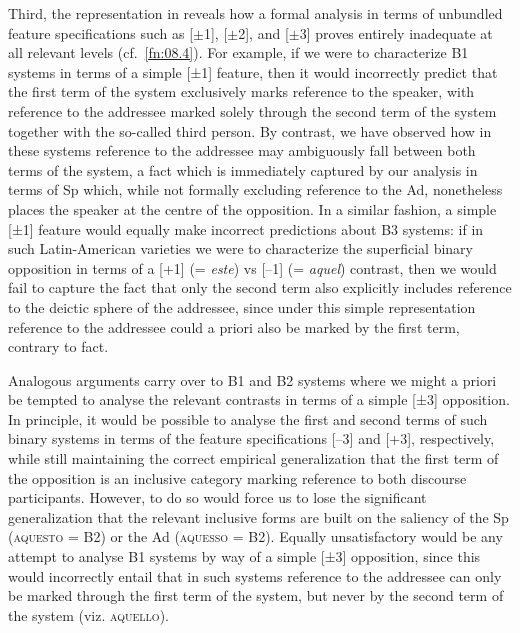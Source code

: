 \documentclass[output=paper]{langsci/langscibook}
\begin{document}
Third, the representation in  reveals how a formal analysis
in terms of unbundled feature specifications such as [${\pm}$1], [${\pm}$2],
and [${\pm}$3] proves entirely inadequate at all relevant levels (cf.\
\cref{fn:08.4}).  For example, if we were to characterize B1 systems
in terms of a simple [±1] feature, then it would incorrectly predict that the
first term of the system exclusively marks reference to the speaker, with
reference to the addressee marked solely through the second term of the system
together with the so-called third person. By contrast, we have observed how in
these systems reference to the addressee may ambiguously fall between both
terms of the system, a fact which is immediately captured by our analysis in
terms of Sp which, while not formally excluding reference to the Ad,
nonetheless places the speaker at the centre of the opposition. In a similar
fashion, a simple [±1] feature would equally make incorrect predictions about
B3 systems: if in such Latin-American \ili{Spanish} varieties we were to
characterize the superficial binary opposition in terms of a [+1] (=
\emph{este}) vs [–1] (= \emph{aquel}) contrast, then we would fail to capture
the fact that only the second term also explicitly includes reference to the
deictic sphere of the addressee, since under this simple representation
reference to the addressee could a priori also be marked by the first
term, contrary to fact.

Analogous arguments carry over to B1 and B2 systems where we might
a priori be tempted to analyse the relevant contrasts in terms of a
simple [±3] opposition. In principle, it would be possible to analyse the first
and second terms of such binary systems in terms of the feature specifications
[–3] and [+3], respectively, while still maintaining the correct empirical
generalization that the first term of the opposition is an inclusive category
marking reference to both discourse participants. However, to do so would force
us to lose the significant generalization \parencite[cf.][504f]{HarRit2002}
that the relevant inclusive forms are built on the saliency of the Sp
(\textsc{aquesto} = B2\tss{A}) or the Ad (\textsc{aquesso} = B2\tss{B}).
Equally unsatisfactory would be any attempt to analyse B1\tss{B/C} systems by
way of a simple [±3] opposition, since this would incorrectly entail that in
such systems reference to the addressee can only be marked through the first
term of the system, but never by the second term of the system (viz.
\textsc{aquello}).
\end{document}
